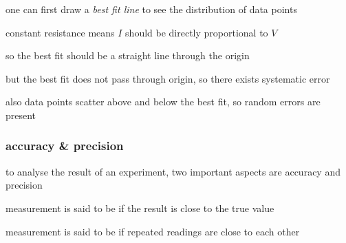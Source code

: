 
\sol one can first draw a \emph{best fit line} to see the distribution of data points

constant resistance means $I$ should be directly proportional to $V$

so the best fit should be a straight line through the origin

but the best fit does not pass through origin, so there exists systematic error

also data points scatter above and below the best fit, so random errors are present \eoe


\subsubsection{accuracy \& precision}

to analyse the result of an experiment, two important aspects are accuracy and precision

\begin{ilight}
	measurement is said to be  if the result is close to the true value
\end{ilight}

\begin{ilight}
	measurement is said to be  if repeated readings are close to each other
\end{ilight}

